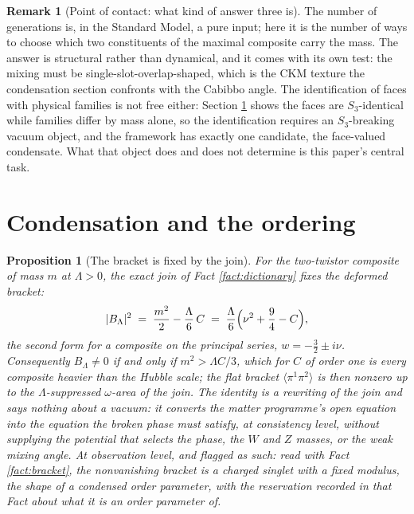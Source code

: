 \documentclass[11pt]{article}
\newtheorem{proposition}[theorem]{Proposition}
\theoremstyle{definition}
\newtheorem{remark}[theorem]{Remark}
\newcommand{\br}[1]{\langle #1\rangle}
\begin{document}
\begin{remark}[Point of contact: what kind of answer three is]\label{rem:three}
The number of generations is, in the Standard Model, a pure input; here it is the number of ways to choose which two constituents of the maximal composite carry the mass. The answer is structural rather than dynamical, and it comes with its own test: the mixing must be single-slot-overlap-shaped, which is the CKM texture the condensation section confronts with the Cabibbo angle. The identification of faces with physical families is not free either: Section \ref{sec:condensation} shows the faces are $S_{3}$-identical while families differ by mass alone, so the identification requires an $S_{3}$-breaking vacuum object, and the framework has exactly one candidate, the face-valued condensate. What that object does and does not determine is this paper's central task.
\end{remark}

\section{Condensation and the ordering}\label{sec:condensation}

\begin{proposition}[The bracket is fixed by the join]\label{prop:condensation}
For the two-twistor composite of mass $m$ at $\Lambda > 0$, the exact join of Fact \ref{fact:dictionary} fixes the deformed bracket:
\begin{equation}\label{eq:gap}
|B_{\Lambda}|^{2} \;=\; \frac{m^{2}}{2} - \frac{\Lambda}{6}\,C \;=\; \frac{\Lambda}{6}\Bigl(\nu^{2} + \frac{9}{4} - C\Bigr),
\end{equation}
the second form for a composite on the principal series, $w = -\tfrac32 \pm i\nu$. Consequently $B_{\Lambda} \ne 0$ if and only if $m^{2} > \Lambda C/3$, which for $C$ of order one is every composite heavier than the Hubble scale; the flat bracket $\br{\pi^{1}\pi^{2}}$ is then nonzero up to the $\Lambda$-suppressed $\omega$-area of the join. The identity is a rewriting of the join and says nothing about a vacuum: it converts the matter programme's open equation into the equation the broken phase must satisfy, at consistency level, without supplying the potential that selects the phase, the $W$ and $Z$ masses, or the weak mixing angle. At observation level, and flagged as such: read with Fact \ref{fact:bracket}, the nonvanishing bracket is a charged singlet with a fixed modulus, the shape of a condensed order parameter, with the reservation recorded in that Fact about what it is an order parameter \emph{of}.
\end{proposition}
\end{document}
